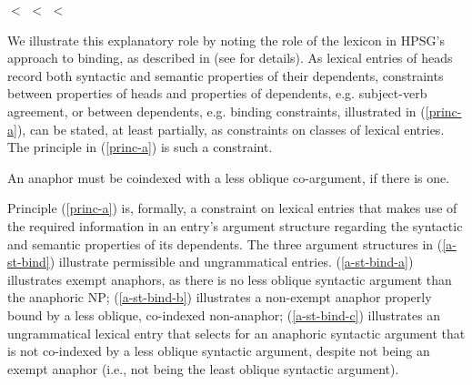 \documentclass[output=paper]{langsci/langscibook}
\begin{document}
\begin{exe}
	\ex\label{obl-hier}  $<$  $<$  $<$ 
\end{exe}

We illustrate this explanatory role by noting the role of the lexicon in HPSG's approach to binding, as described in  (see  for details). As lexical entries of heads record both syntactic and semantic properties of their dependents, constraints between properties of heads and properties of dependents, e.g. subject-verb agreement, or between dependents, e.g. binding constraints, illustrated in (\ref{princ-a}), can be stated, at least partially, as constraints on classes of lexical entries. The principle in (\ref{princ-a}) is such a constraint.

\begin{exe}
	\ex\label{bind}\begin{xlist}
	\end{xlist}	
	\ex\label{princ-a}An anaphor must be coindexed with a less oblique co-argument, if there is one.
\end{exe}

Principle (\ref{princ-a}) is, formally, a constraint on lexical entries that makes use of the required information in an entry's argument structure regarding the syntactic and semantic properties of its dependents. 
The three argument structures in (\ref{a-st-bind}) illustrate permissible and ungrammatical entries. (\ref{a-st-bind-a}) illustrates exempt anaphors, as there is no less oblique syntactic argument than the anaphoric NP; (\ref{a-st-bind-b}) illustrates a non-exempt anaphor properly bound by a less oblique, co-indexed non-anaphor; (\ref{a-st-bind-c}) illustrates an ungrammatical lexical entry that selects for an anaphoric syntactic argument that is not co-indexed by a less oblique syntactic argument, despite not being an exempt anaphor (i.e., not being the least oblique syntactic argument).

\eal
\label{a-st-bind}
\zl
\end{document}
